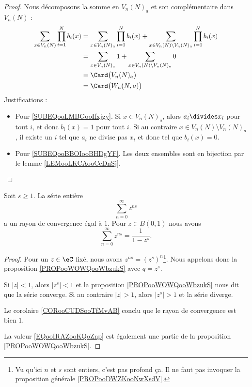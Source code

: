 \begin{proof}
	Nous décomposons la somme en \( V_n(N)_a\) et son complémentaire dans \( V_n(N)\) :
	\begin{subequations}
		\begin{align}
			\sum_{x\in V_n(N)}\prod_{i=1}^Nb_i(x) & =\sum_{x\in V_n(N)_a}\prod_{i=1}^Nb_i(x)+\sum_{x\in V_n(N)\setminus V_n(N)_a}\prod_{i=1}^Nb_i(x) \\
			                                      & =\sum_{x\in V_n(N)_a}1+\sum_{x\in V_n(N)\setminus V_n(N)_a}0       \label{SUBEQooLMBGooIfxjgy}   \\
			                                      & =\Card\big( V_n(N)_a \big)                                                                       \\
			                                      & =\Card\big( W_n(N,a) \big)     \label{SUBEQooBBOIooBHDgYF}
		\end{align}
	\end{subequations}
	Justifications :
	\begin{itemize}
		\item Pour \eqref{SUBEQooLMBGooIfxjgy}.
		      Si \( x\in V_n(N)_a\), alors \( a_i\divides x_i\) pour tout \( i\), et donc \( b_i(x)=1\) pour tout \( i\). Si au contraire \( x\in V_n(N)\setminus V_n(N)_a\), il existe un \( i\) tel que \( a_i\) ne divise pas \( x_i\) et donc tel que \( b_i(x)=0\).
		\item Pour \eqref{SUBEQooBBOIooBHDgYF}. Les deux ensembles sont en bijection par le lemme \ref{LEMooLKCAooCeDnSj}.
	\end{itemize}
\end{proof}

\begin{lemma}       \label{LEMooRJOKooPJGVTr}
	Soit \( s\geq 1\). La série entière
	\begin{equation}
		\sum_{n=0}^{\infty}z^{ns}
	\end{equation}
	a un rayon de convergence égal à \( 1\). Pour \(z\in B(0,1)\) nous avons
	\begin{equation}        \label{EQooIRAZooKQoZnp}
		\sum_{n=0}^{\infty}z^{ns}=\frac{1}{ 1-z^s }.
	\end{equation}
\end{lemma}

\begin{proof}
	Pour un \( z\in \eC\) fixé, nous avons \( z^{ns}=(z^s)^n\)\footnote{Vu qu'ici \( n\) et \( s\) sont entiers, c'est pas profond ça. Il ne faut pas invoquer la proposition générale \ref{PROPooDWZKooNwXsdV}.}. Nous appelons donc la proposition \ref{PROPooWOWQooWbzukS} avec \( q=z^s\).

	Si \( | z |<1\), alors \( | z^s |<1\) et la proposition \ref{PROPooWOWQooWbzukS} nous dit que la série converge. Si au contraire \( | z |>1\), alors \( | z^s |>1\) et la série diverge.

	Le corolaire \ref{CORooCUDSooTfMvAB} conclu que le rayon de convergence est bien \( 1\).

	La valeur \eqref{EQooIRAZooKQoZnp} est également une partie de la proposition \ref{PROPooWOWQooWbzukS}.
\end{proof}


